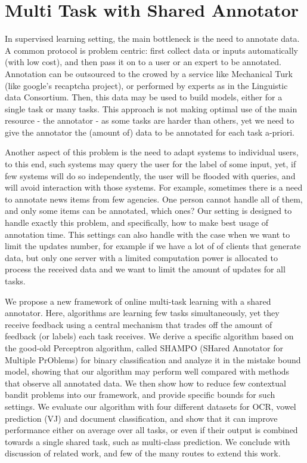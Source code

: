 \section{Multi Task with Shared Annotator}
\label{sec:multi_task_intro}

 In supervised learning setting, the main bottleneck is the need to annotate data. A common protocol is 
 problem centric: first collect data or inputs automatically (with low cost), and then 
 pass it on to a user or an expert to be annotated. Annotation can be outsourced to the crowed by a 
 service like Mechanical Turk (like google's recaptcha project), or performed by experts as
  in the Linguistic data Consortium. Then, this data 
 may be used to build models, either for a single task or many tasks. This approach is not making optimal 
 use of the main resource - the annotator - as some tasks are harder than others, yet we need to give the 
 annotator the (amount of) data to be annotated for each task a-priori. 
 
 Another aspect of this problem is the need to adapt systems to individual users, to this end, 
 such systems may query the user for the label of some input, yet, if few systems will do so 
 independently, the user will be flooded with queries, and will avoid interaction with those systems. 
 For example, sometimes there is a need to annotate news items from few agencies. One person cannot 
 handle all of them, and only some items can be annotated, which ones? Our setting is designed to handle 
 exactly this problem, and specifically, how to make best usage of annotation time.
 This settings can also handle with the case when we want to limit the updates number, 
 for example if we have a lot of of clients that generate data, but only one server with a limited computation 
 power is allocated to process the received data and we want to limit the amount of updates for all tasks.
 
 We propose a new framework of online multi-task learning with a shared annotator. 
 Here, algorithms are learning few tasks simultaneously, yet they receive feedback using a central 
 mechanism that trades off the amount of feedback (or labels) each task receives. We derive a specific 
 algorithm based on the good-old Perceptron algorithm, called SHAMPO (SHared Annotator for Multiple 
 PrOblems) for binary classification and analyze it in the mistake bound model, showing that our algorithm 
 may perform well compared with methods that observe all annotated data. We then show how to reduce 
 few contextual bandit problems into our framework, and provide specific bounds for such 
settings. We evaluate our algorithm with four different datasets for OCR, vowel prediction (VJ) and 
document classification, and show that it can improve performance either on average over all tasks, 
or even if their output is combined towards a single shared task, such as multi-class prediction.
 We conclude with discussion of related work, and few of the many routes to extend this work.
